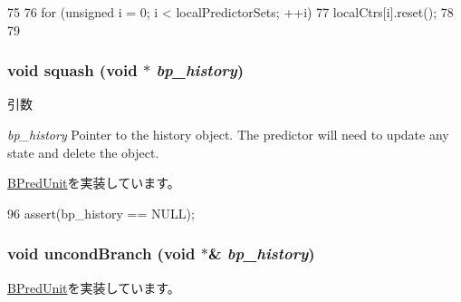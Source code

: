 \begin{DoxyCode}
75 {
76     for (unsigned i = 0; i < localPredictorSets; ++i) {
77         localCtrs[i].reset();
78     }
79 }
\end{DoxyCode}
\hypertarget{classLocalBP_aeb215cee5cdccdf52d02b73fffe80220}{
\subsubsection[{squash}]{\setlength{\rightskip}{0pt plus 5cm}void squash (void $\ast$ {\em bp\_\-history})}}
\label{classLocalBP_aeb215cee5cdccdf52d02b73fffe80220}

\begin{DoxyParams}{引数}
\item[{\em bp\_\-history}]Pointer to the history object. The predictor will need to update any state and delete the object. \end{DoxyParams}


\hyperlink{classBPredUnit_a2af63ba741727bdf58e2b2dc22a912ed}{BPredUnit}を実装しています。


\begin{DoxyCode}
96     { assert(bp_history == NULL); }
\end{DoxyCode}
\hypertarget{classLocalBP_ad3d898a5eab93d923a1073fe6a0f0030}{
\subsubsection[{uncondBranch}]{\setlength{\rightskip}{0pt plus 5cm}void uncondBranch (void $\ast$\& {\em bp\_\-history})}}
\label{classLocalBP_ad3d898a5eab93d923a1073fe6a0f0030}


\hyperlink{classBPredUnit_a17161e0c51444f148e49e4df2ba89704}{BPredUnit}を実装しています。


